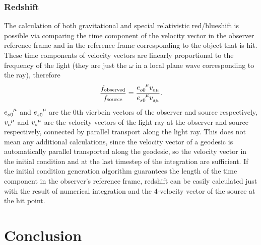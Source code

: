 \documentclass[pdftex,12pt,a4paper]{article}
\begin{document}
	\subsubsection{Redshift}
		The calculation of both gravitational and special relativistic red/blueshift is possible via comparing the time component of the velocity vector in the observer reference frame and in the reference frame corresponding to the object that is hit. These time components of velocity vectors are linearly proportional to the frequency of the light (they are just the $\omega$ in a local plane wave corresponding to the ray), therefore
		\begin{equation}
			\frac{f_{\text{observed}}}{f_{\text{source}}} = \frac{\tensor{e}{_o_0^\mu}\tensor{v}{_o_\mu}}{\tensor{e}{_s_0^\mu}\tensor{v}{_s_\mu}}.
		\end{equation}
		$\tensor{e}{_o_0^\mu}$ and $\tensor{e}{_s_0^\mu}$ are the 0th vierbein vectors of the observer and source respectively, $\tensor{v}{_o^\mu}$ and $\tensor{v}{_s^\mu}$ are the velocity vectors of the light ray at the observer and source respectively, connected by parallel transport along the light ray. This does not mean any additional calculations, since the velocity vector of a geodesic is automatically parallel transported along the geodesic, so the velocity vector in the initial condition and at the last timestep of the integration are sufficient. If the initial condition generation algorithm guarantees the length of the time component in the observer's reference frame, redshift can be easily calculated just with the result of numerical integration and the 4-velocity vector of the source at the hit point. 
	\section{Conclusion}
		
	
    
\end{document}
